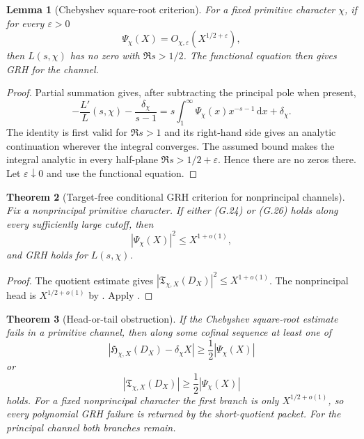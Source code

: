 \documentclass[11pt]{article}
\newtheorem{theorem}{Theorem}[section]
\newtheorem{lemma}[theorem]{Lemma}
\theoremstyle{definition}
\theoremstyle{remark}
\newcommand{\dd}{\mathrm d}
\begin{document}
\begin{lemma}[Chebyshev square-root criterion]
\label{lem:grhouter-Chebyshev-criterion}
For a fixed primitive character \(\chi\), if for every \(\varepsilon>0\)
\[
 \Psi_\chi(X)=O_{\chi,\varepsilon}(X^{1/2+\varepsilon}),
\]
then \(L(s,\chi)\) has no zero with \(\Re s>1/2\).  The functional equation
then gives GRH for the channel.
\end{lemma}

\begin{proof}
Partial summation gives, after subtracting the principal pole when present,
\[
 -\frac{L'}{L}(s,\chi)-\frac{\delta_\chi}{s-1}
 =s\int_1^\infty\Psi_\chi(x)x^{-s-1}\,\dd x
  +\delta_\chi.
\]
The identity is first valid for \(\Re s>1\) and its right-hand side gives
an analytic continuation wherever the integral converges.  The assumed bound makes
the integral analytic in every half-plane \(\Re s>1/2+\varepsilon\).  Hence
there are no zeros there.  Let \(\varepsilon\downarrow0\) and use the
functional equation.
\end{proof}

\begin{theorem}[Target-free conditional GRH criterion for nonprincipal channels]
\label{thm:grhouter-nonprincipal-GRH}
Fix a nonprincipal primitive character.  If either
\textup{(G.24)} or \textup{(G.26)} holds along every sufficiently large
cutoff, then
\[
 \boxed{
 |\Psi_\chi(X)|^2\le X^{1+o(1)},}
 \tag{G.27}
\]
and GRH holds for \(L(s,\chi)\).
\end{theorem}

\begin{proof}
The quotient estimate gives
\(|\mathfrak T_{\chi,X}(D_X)|^2\le X^{1+o(1)}\).  The nonprincipal head is
\(X^{1/2+o(1)}\) by .  Apply
.
\end{proof}

\begin{theorem}[Head-or-tail obstruction]
\label{thm:grhouter-head-tail-obstruction}
If the Chebyshev square-root estimate fails in a primitive channel, then along
some cofinal sequence at least one of
\[
 \boxed{
 |\mathfrak H_{\chi,X}(D_X)-\delta_\chi X|
 \ge\frac12|\Psi_\chi(X)|}
 \tag{G.28}
\]
or
\[
 \boxed{
 |\mathfrak T_{\chi,X}(D_X)|
 \ge\frac12|\Psi_\chi(X)|}
 \tag{G.29}
\]
holds.  For a fixed nonprincipal character the first branch is only
\(X^{1/2+o(1)}\), so every polynomial GRH failure is returned by the
short-quotient packet.  For the principal channel both branches remain.
\end{theorem}
\end{document}
